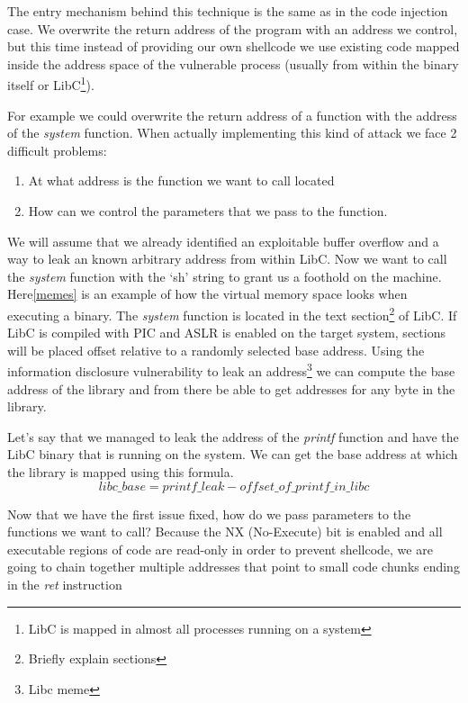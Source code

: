 \documentclass{article}
\begin{document}
The entry mechanism behind this technique is the same as in the code injection
case. We overwrite the return address of the program with an address we control,
but this time instead of providing our own shellcode we use existing code mapped
inside the address space of the vulnerable process (usually from within the
binary itself or LibC\footnote{LibC is mapped in almost all processes running on
a system}).

For example we could overwrite the return address of a function with the address
of the \emph{system} function. When actually implementing this kind of attack
we face 2 difficult problems:
\begin{enumerate}
  \item At what address is the function we want to call located
  \item How can we control the parameters that we pass to the function.
\end{enumerate}

We will assume that we already identified an exploitable buffer overflow and a
way to leak an known arbitrary address from within LibC. Now we want to call
the \emph{system} function with the `sh' string to grant us a foothold on the
machine. Here\ref{memes} is an example of how the virtual memory space looks
when executing a binary. The \emph{system} function is located in the text
section\footnote{Briefly explain sections} of LibC. If LibC is compiled with PIC
and ASLR is enabled on the target system, sections will be placed offset
relative to a randomly selected base address. Using the information disclosure
vulnerability to leak an address\footnote{Libc meme} we can compute the base
address of the library and from there be able to get addresses for any byte
in the library.

Let's say that we managed to leak the address of the \emph{printf} function and
have the LibC binary that is running on the system. We can get the base address at
which the library is mapped using this formula.
\begin{equation}
  libc\_{base} = printf\_leak - offset\_{of}\_{printf}\_{in}\_{libc}
\end{equation}

Now that we have the first issue fixed, how do we pass parameters to the functions
we want to call? Because the NX (No-Execute) bit is enabled and all executable
regions of code are read-only in order to prevent shellcode, we are going to chain
together multiple addresses that point to small code chunks ending in the
\emph{ret} instruction
\end{document}
